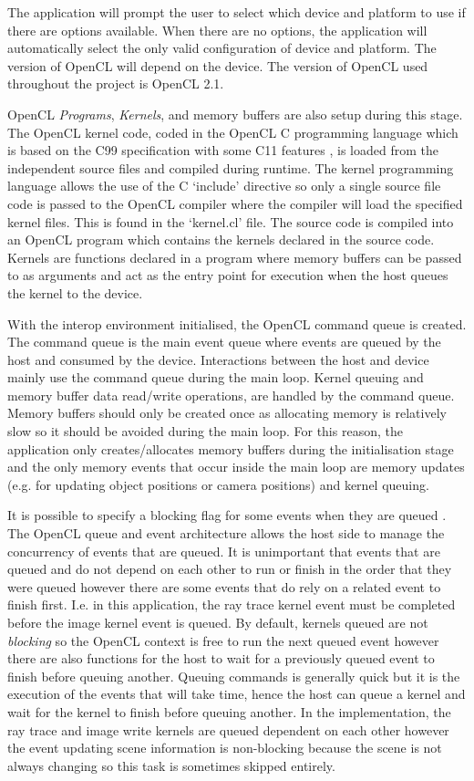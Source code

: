 \documentclass[final]{cmpreport}
\begin{document}
The application will prompt the user to select which device and platform to use if there are options available. When there are no options, the application will automatically select the only valid configuration of device and platform. The version of OpenCL will depend on the device. The version of OpenCL used throughout the project is OpenCL 2.1.

OpenCL \textit{Programs}, \textit{Kernels}, and memory buffers are also setup during this stage. The OpenCL kernel code, coded in the OpenCL C programming language which is based on the C99 specification with some C11 features \citep{howes2015opencl}, is loaded from the independent source files and compiled during runtime. The kernel programming language allows the use of the C `include' directive so only a single source file code is passed to the OpenCL compiler where the compiler will load the specified kernel files. This is found in the `kernel.cl' file. The source code is compiled into an OpenCL program which contains the kernels declared in the source code. Kernels are functions declared in a program where memory buffers can be passed to as arguments and act as the entry point for execution when the host queues the kernel to the device. \citep{howes2015opencl}

With the interop environment initialised, the OpenCL command queue is created. The command queue is the main event queue where events are queued by the host and consumed by the device. Interactions between the host and device mainly use the command queue during the main loop. Kernel queuing and memory buffer data read/write operations, are handled by the command queue. Memory buffers should only be created once as allocating memory is relatively slow so it should be avoided during the main loop. For this reason, the application only creates/allocates memory buffers during the initialisation stage and the only memory events that occur inside the main loop are memory updates (e.g. for updating object positions or camera positions) and kernel queuing.

It is possible to specify a blocking flag for some events when they are queued \citep{howes2015opencl}. The OpenCL queue and event architecture allows the host side to manage the concurrency of events that are queued. It is unimportant that events that are queued and do not depend on each other to run or finish in the order that they were queued however there are some events that do rely on a related event to finish first. I.e. in this application, the ray trace kernel event must be completed before the image kernel event is queued. By default, kernels queued are not \textit{blocking} so the OpenCL context is free to run the next queued event however there are also functions for the host to wait for a previously queued event to finish before queuing another. Queuing commands is generally quick but it is the execution of the events that will take time, hence the host can queue a kernel and wait for the kernel to finish before queuing another. In the implementation, the ray trace and image write kernels are queued dependent on each other however the event updating scene information is non-blocking because the scene is not always changing so this task is sometimes skipped entirely. 
\end{document}
